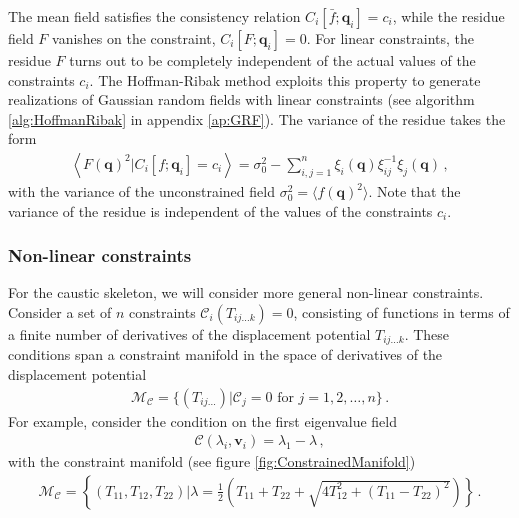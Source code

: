 \documentclass[a4paper, 11pt]{article}
\begin{document}
The mean field satisfies the consistency relation $C_i[\bar{f};\bm{q}_i]=c_i$, while the residue field $F$ vanishes on the constraint, $C_i[F;\bm{q}_i]=0$. For linear constraints, the residue $F$ turns out to be completely independent of the actual values of the constraints $c_i$. The Hoffman-Ribak method exploits this property to generate realizations of Gaussian random fields with linear constraints (see algorithm \ref{alg:HoffmanRibak} in appendix \ref{ap:GRF}). The variance of the residue takes the form
\begin{align}
\left\langle F(\bm{q})^2|C_i[f;\bm{q}_i]=c_i \right\rangle = \sigma_0^2 - \sum_{i,j=1}^n\xi_i(\bm{q}) \xi_{ij}^{-1} \xi_j(\bm{q})\,,
\end{align}
with the variance of the unconstrained field $\sigma_0^2 = \langle f(\bm{q})^2\rangle$. Note that the variance of the residue is independent of the values of the constraints $c_i$.

\subsubsection{Non-linear constraints}
For the caustic skeleton, we will consider more general non-linear constraints. Consider a set of $n$ constraints $\mathcal{C}_i(T_{ij\dots k}) = 0$, consisting of functions in terms of a finite number of derivatives of the displacement potential $T_{ij\dots k}$. These conditions span a constraint manifold in the space of derivatives of the displacement potential
\begin{align}
\mathcal{M}_{\mathcal{C}} = 
\{(T_{ij\dots})|\mathcal{C}_j=0 \text{ for } j = 1, 2, \dots ,n\}\,.
\end{align}
For example, consider the condition on the first eigenvalue field
\begin{align}
\mathcal{C}(\lambda_i,\bm{v}_i) = \lambda_1 - \lambda\,,
\end{align}
with the constraint manifold (see figure \ref{fig:ConstrainedManifold})
\begin{align}
\mathcal{M}_\mathcal{C}=\left\{(T_{11},T_{12},T_{22})\bigg| \lambda = \frac{1}{2}\left(T_{11}+T_{22} + \sqrt{4 T_{12}^2 + (T_{11}-T_{22})^2}\right)\right \} \,.
\label{eq:exampleConstrainedManifold}
\end{align}
\end{document}
